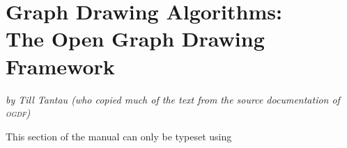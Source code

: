 %
%
%

\section[Graph Drawing Algorithms: The Open Graph Drawing Framework]{Graph Drawing Algorithms:\\ The Open Graph Drawing Framework}

\label{section-last-graphdrawing-library-in-manual}

{\emph{by Till Tantau (who copied much of the text from
    the source documentation of \textsc{ogdf})}}

\ifluatex
\else
    This section of the manual can only be typeset using 
    \expandafter\endinput
\fi

\ifgdccodeogdf
\else
    In order to typeset this section, \hologo{LuaTeX} must be able to link C code at
    runtime and the \textsc{ogdf} graph drawing C libraries must be installed
    on your system. You will find the sources in the |c| subdirectory of the
    installation, where you will also find example Makefiles.
    \expandafter\endinput
\fi

\emph{Remark:} The integration of the \textsc{ogdf} library is still under
construction and the examples in this section are more a proof-of-concept. So,
use at your own risk.

\includeluadocumentationof{pgf.gd.ogdf.library}

\includeluadocumentationof{pgf.gd.doc.ogdf.layered}

\includeluadocumentationof{pgf.gd.doc.ogdf.layered.SugiyamaLayout}

\includeluadocumentationof{pgf.gd.doc.ogdf.module.RankingModule}
\includeluadocumentationof{pgf.gd.doc.ogdf.layered.CoffmanGrahamRanking}
\includeluadocumentationof{pgf.gd.doc.ogdf.layered.LongestPathRanking}
\includeluadocumentationof{pgf.gd.doc.ogdf.layered.OptimalRanking}

\includeluadocumentationof{pgf.gd.doc.ogdf.module.TwoLayerCrossMin}
\includeluadocumentationof{pgf.gd.doc.ogdf.layered.BarycenterHeuristic}
\includeluadocumentationof{pgf.gd.doc.ogdf.layered.GreedyInsertHeuristic}
\includeluadocumentationof{pgf.gd.doc.ogdf.layered.MedianHeuristic}
\includeluadocumentationof{pgf.gd.doc.ogdf.layered.SiftingHeuristic}
\includeluadocumentationof{pgf.gd.doc.ogdf.layered.SplitHeuristic}

